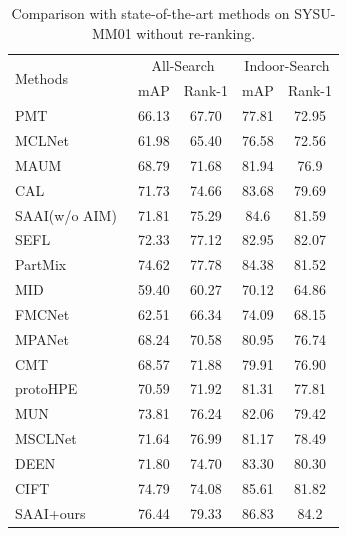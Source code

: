 \begin{table}
\small
\centering
\renewcommand\tabcolsep{5pt}
	\begin{tabular}{l|cc|cc}
		\hline
		\multirow{2}{*}{Methods} & \multicolumn{2}{c|}{All-Search} &\multicolumn{2}{c}{Indoor-Search}\\ \cline{2-5}
              & mAP & Rank-1 & mAP & Rank-1 \\ \cline{1-5}
             PMT\cite{lu2023learning}& 66.13& 67.70& 77.81& 72.95\\
             MCLNet~\cite{hao2021cross}& 61.98 &65.40&76.58 &72.56\\
             MAUM~\cite{Liu2022LearningMU}& 68.79 &71.68& 81.94 &76.9\\
             CAL\cite{CAL}& 71.73 &74.66& 83.68 &79.69\\
             SAAI(w/o AIM)~\cite{fang2023visible}&  71.81& 75.29&  84.6 &81.59\\
             SEFL\cite{feng2023shape}& 72.33 &77.12& 82.95 &82.07\\
             PartMix\cite{kim2023partmix}& 74.62 &77.78& 84.38 &81.52\\
             MID~\cite{Huang2022ModalityAdaptiveMA} & 59.40 &60.27& 70.12 &64.86\\
             FMCNet~\cite{zhang2022fmcnet}& 62.51 &66.34& 74.09 &68.15\\
             MPANet~\cite{wu2021discover}& 68.24 &70.58& 80.95 &76.74\\
             CMT~\cite{jiang2022cross}& 68.57 &71.88& 79.91 &76.90\\
             protoHPE~\cite{zhang2023protohpe}& 70.59 &71.92&81.31 &77.81\\
             MUN~\cite{yu2023modality}& 73.81 &76.24& 82.06 &79.42\\
             MSCLNet~\cite{zhang2022modality}& 71.64 &76.99& 81.17 &78.49\\
             DEEN~\cite{zhang2023diverse}& 71.80 &74.70& 83.30 &80.30\\
             CIFT~\cite{li2022counterfactual}& 74.79 &74.08& 85.61 &81.82\\
             \cline{1-5}
             \rowcolor{gray!20}
            SAAI+ours&76.44&79.33& 86.83& 84.2\\
             \cline{1-5}
	\end{tabular}
             \caption{Comparison with state-of-the-art methods on SYSU-MM01 without re-ranking.}
             \label{tab:sys}                               
\end{table}

